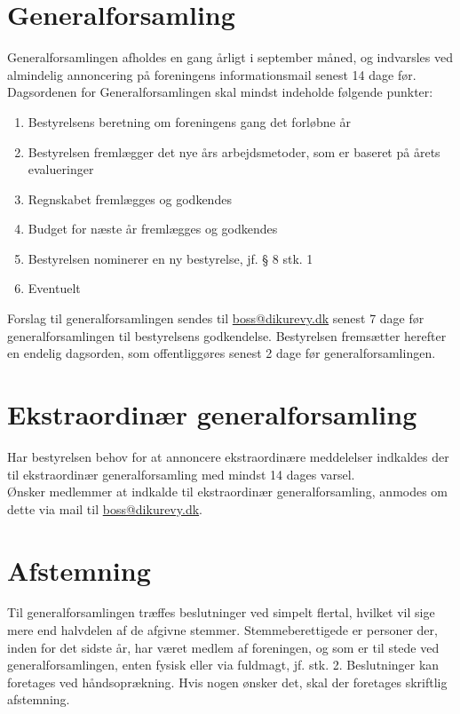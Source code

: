 \documentclass[a4paper,11pt,danish]{article}
\begin{document}
\section{Generalforsamling}
Generalforsamlingen afholdes en gang årligt i september måned, og indvarsles
ved almindelig annoncering på foreningens informationsmail senest 14 dage før.\\

\noindent Dagsordenen for Generalforsamlingen skal mindst indeholde følgende
punkter:

\begin{enumerate}
\item Bestyrelsens beretning om foreningens gang det forløbne år
\item Bestyrelsen fremlægger det nye års arbejdsmetoder, som er baseret på årets
evalueringer
\item Regnskabet fremlægges og godkendes
\item Budget for næste år fremlægges og godkendes
\item Bestyrelsen nominerer en ny bestyrelse, jf. § 8 stk. 1
\item Eventuelt
\end{enumerate}

\noindent Forslag til generalforsamlingen sendes til \url{boss@dikurevy.dk}
senest 7 dage før generalforsamlingen til bestyrelsens godkendelse. Bestyrelsen
fremsætter herefter en endelig dagsorden, som offentliggøres senest 2 dage før
generalforsamlingen.

\section{Ekstraordinær generalforsamling}
Har bestyrelsen behov for at annoncere ekstraordinære meddelelser indkaldes der
til ekstraordinær generalforsamling med mindst 14 dages varsel.\\

\noindent Ønsker medlemmer at indkalde til ekstraordinær generalforsamling,
anmodes om dette via mail til \url{boss@dikurevy.dk}.

\section{Afstemning}
Til generalforsamlingen træffes beslutninger ved simpelt flertal, hvilket
vil sige mere end halvdelen af de afgivne stemmer. Stemmeberettigede er
personer der, inden for det sidste år, har været medlem af foreningen, og som er
til stede ved generalforsamlingen, enten fysisk eller via fuldmagt, jf. stk. 2.
Beslutninger kan foretages ved håndsoprækning. Hvis nogen ønsker det, skal der
foretages skriftlig afstemning.
\end{document}
